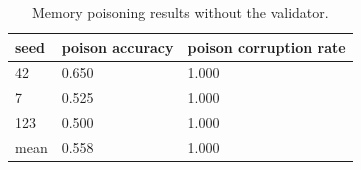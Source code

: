 \begin{table}[t]
\centering
\caption{Memory poisoning results without the validator.}
\label{tab:memory\_poisoning}
\begin{tabular}{lll}
\toprule
seed & poison accuracy & poison corruption rate \\
\midrule
42 & 0.650 & 1.000 \\
7 & 0.525 & 1.000 \\
123 & 0.500 & 1.000 \\
mean & 0.558 & 1.000 \\
\bottomrule
\end{tabular}
\end{table}
